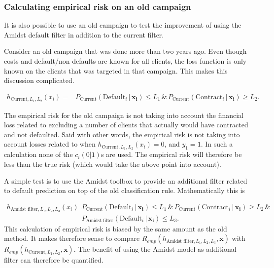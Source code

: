 \documentclass{article}
\theoremstyle{theorem}
\theoremstyle{definition}
\newcommand{\bv}[1]{\bm{#1}}
\begin{document}
\subsubsection*{Calculating empirical risk on an old campaign}

It is also possible to use an old campaign to test the improvement of using the Amidst default filter in addition to the current filter. 

Consider an old campaign that was done more than two years ago. Even though costs and default/non defaults are known for all clients, the loss function is only known on the clients that was targeted in that campaign.  This makes this discussion complicated. 

\begin{equation}
\begin{split}
\label{eq:amidst}
h_{\mbox{Current},L_1,L_2}(x_i) = &
P_{\mbox{Current}}(\mbox{Default}_i \,|\, \bv{x_i}) \leq L_1
 \, \& \,
P_{\mbox{Current}}(\mbox{Contract}_i \,|\, \bv{x_i}) \geq L_2.
\end{split}
\end{equation}


The empirical risk for the old campaign is not taking into account the financial loss related to excluding a number of clients that actually would have contracted and not defaulted.  Said with other words, the empirical risk is not taking into account losses related to when $h_{\mbox{Current},L_1,L_2}(x_i) = 0$, and $y_1 = 1$.  In such a calculation none of the $c_i(0|1)$s are used.  The empirical risk will therefore be less than the true risk (which would take the above point into account).

A simple test is to use the Amidst toolbox to provide an additional filter related to default prediction on top of the old classification rule.  Mathematically this is

\begin{equation}
\begin{split}
\label{eq:filter}
h_{\mbox{Amidst filter},L_1,L_2,L_3}(x_i) = &
P_{\mbox{Current}}(\mbox{Default}_i \,|\, \bv{x_i}) \leq L_1
 \, \& \,
P_{\mbox{Current}}(\mbox{Contract}_i \,|\, \bv{x_i}) \geq L_2
\, \& \,  
\\ &
P_{\mbox{Amidst filter}}(\mbox{Default}_i \,|\, \bv{x_i}) \leq L_3.
\end{split}
\end{equation}
This calculation of empirical risk is biased by the same amount as the old method.  It makes therefore sense to compare $R_{emp}(h_{\mbox{Amidst filter},L_1,L_2,L_3}, \bv{x}) $ with $R_{emp}(h_{\mbox{Current},L_1,L_2}, \bv{x}) $.
The benefit of using the Amidst model as additional filter can therefore be quantified.
\end{document}
